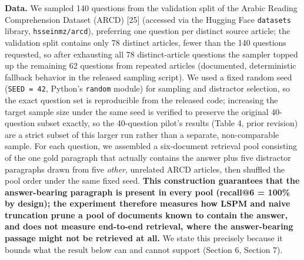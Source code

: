 \textbf{Data.} We sampled 140 questions from the validation split of the Arabic Reading Comprehension Dataset (ARCD) [25] (accessed via the Hugging Face \texttt{datasets} library, \texttt{hsseinmz/arcd}), preferring one question per distinct source article; the validation split contains only 78 distinct articles, fewer than the 140 questions requested, so after exhausting all 78 distinct-article questions the sampler topped up the remaining 62 questions from repeated articles (documented, deterministic fallback behavior in the released sampling script). We used a fixed random seed (\texttt{SEED = 42}, Python's \texttt{random} module) for sampling and distractor selection, so the exact question set is reproducible from the released code; increasing the target sample size under the same seed is verified to preserve the original 40-question subset exactly, so the 40-question pilot's results (Table 4, prior revision) are a strict subset of this larger run rather than a separate, non-comparable sample. For each question, we assembled a six-document retrieval pool consisting of the one gold paragraph that actually contains the answer plus five distractor paragraphs drawn from five \textit{other}, unrelated ARCD articles, then shuffled the pool order under the same fixed seed. \textbf{This construction guarantees that the answer-bearing paragraph is present in every pool (recall@6 = 100\% by design); the experiment therefore measures how LSPM and naive truncation prune a pool of documents known to contain the answer, and does not measure end-to-end retrieval, where the answer-bearing passage might not be retrieved at all.} We state this precisely because it bounds what the result below can and cannot support (Section 6, Section 7).


